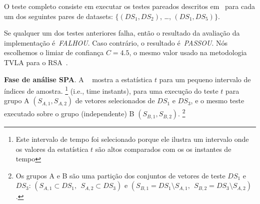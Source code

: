 O teste completo consiste em executar os testes pareados descritos em~\cite{Witteman2011} para cada um dos seguintes pares de datasets: $\{(DS_1,DS_2)$, \dots, $(DS_1,DS_5) \}$.
%

%
Se qualquer um dos testes anteriores falha, então o resultado da avaliação da implementação é~\textit{FALHOU}. Caso contrário, o resultado é~\textit{PASSOU}. Nós escolhemos o limiar de confiança $C = 4.5$, o mesmo valor usado na metodologia TVLA para o RSA~\cite{Witteman2011}.
%
%

\noindent \textbf{Fase de análise SPA}. A ~ mostra a estatística $t$ para um pequeno intervalo de índices de amostra.
%
%
\footnote{Este intervalo de tempo foi selecionado porque ele ilustra um intervalo onde os valores da estatística $t$ são altos comparados com os os instantes de tempo} (i.e., time instants),
%
%
para uma execução do teste $t$ para grupo A $(S_{A,1},S_{A,2})$ de vetores selecionados de $DS_1$ e $DS_3$, e o mesmo teste executado sobre o grupo (independente) B $(S_{B,1},S_{B,2})$.
%
%
\footnote{Os grupos A e B são uma partição dos conjuntos de vetores de teste $DS_1$ e $DS_3$: $(S_{A,1}\subset DS_1,\ \  S_{A,2}\subset DS_3)$ e $(S_{B,1} = DS_1\setminus S_{A,1},\ \ S_{B,2} = DS_3\setminus S_{A,2})$.} 
%
%

